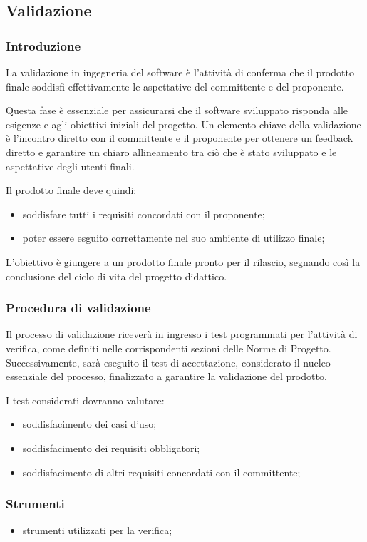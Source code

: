 \subsection{Validazione}

\subsubsection{Introduzione}
La validazione in ingegneria del software è l'attività di conferma che il prodotto finale soddisfi effettivamente le aspettative del committente e del proponente. 

Questa fase è essenziale per assicurarsi che il software sviluppato risponda alle esigenze e agli obiettivi iniziali del progetto. 
Un elemento chiave della validazione è l'incontro diretto con il committente e il proponente per ottenere un feedback diretto e garantire un chiaro allineamento tra ciò che è stato sviluppato e le aspettative degli utenti finali. 

Il prodotto finale deve quindi: 
\begin{itemize}
    \item 
        soddisfare tutti i requisiti concordati con il proponente; 
    \item 
        poter essere esguito correttamente nel suo ambiente di utilizzo finale; 
\end{itemize}

L'obiettivo è giungere a un prodotto finale pronto per il rilascio, segnando così la conclusione del ciclo di vita del progetto didattico. 

\subsubsection{Procedura di validazione}
Il processo di validazione riceverà in ingresso i test programmati per l'attività di verifica, come definiti nelle corrispondenti sezioni delle Norme di Progetto. Successivamente, sarà eseguito il test di accettazione, considerato il nucleo essenziale del processo, finalizzato a garantire la validazione del prodotto. 

I test considerati dovranno valutare: 
\begin{itemize}
    \item  
        soddisfacimento dei casi d’uso;
    \item 
        soddisfacimento dei requisiti obbligatori;
    \item 
        soddisfacimento di altri requisiti concordati con il committente; 
\end{itemize}

\subsubsection{Strumenti}
\begin{itemize}
    \item 
        strumenti utilizzati per la verifica; 
\end{itemize}
